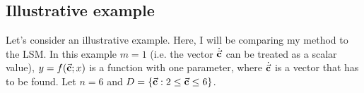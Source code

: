 \subsection{Illustrative example}
Let's consider an illustrative example. Here, I will be comparing my method to the LSM. In this example $m=1$ (i.e. the vector $\dot{\vec{\textbf{c}}}$ can be treated as a scalar value), $y=f(\vec{\textbf{c}};x)$ is a function with one parameter, where $\dot{\vec{\textbf{c}}}$ is a vector that has to be found. Let $n=6$ and $D=\{ \vec{\textbf{c}}: 2 \leq \vec{\textbf{c}} \leq 6 \}$.

